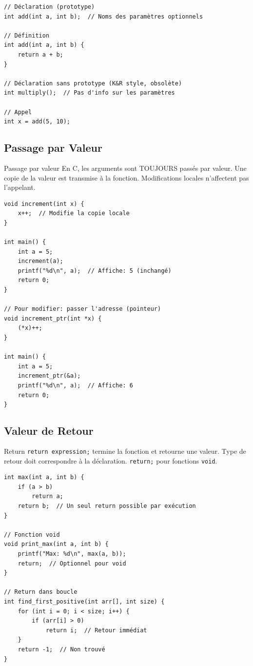 \documentclass[10pt,a4paper]{article}
\begin{document}
\begin{lstlisting}[caption={Déclaration et définition}]
// Déclaration (prototype)
int add(int a, int b);  // Noms des paramètres optionnels

// Définition
int add(int a, int b) {
    return a + b;
}

// Déclaration sans prototype (K&R style, obsolète)
int multiply();  // Pas d'info sur les paramètres

// Appel
int x = add(5, 10);
\end{lstlisting}

\subsection{Passage par Valeur}

\begin{techbox}{Passage par valeur}
En C, les arguments sont TOUJOURS passés par valeur. Une copie de la valeur est transmise à la fonction. Modifications locales n'affectent pas l'appelant.
\end{techbox}

\begin{lstlisting}[caption={Passage par valeur}]
void increment(int x) {
    x++;  // Modifie la copie locale
}

int main() {
    int a = 5;
    increment(a);
    printf("%d\n", a);  // Affiche: 5 (inchangé)
    return 0;
}

// Pour modifier: passer l'adresse (pointeur)
void increment_ptr(int *x) {
    (*x)++;
}

int main() {
    int a = 5;
    increment_ptr(&a);
    printf("%d\n", a);  // Affiche: 6
    return 0;
}
\end{lstlisting}

\subsection{Valeur de Retour}

\begin{techbox}{Return}
\texttt{return expression;} termine la fonction et retourne une valeur. Type de retour doit correspondre à la déclaration. \texttt{return;} pour fonctions \texttt{void}.
\end{techbox}

\begin{lstlisting}[caption={Valeurs de retour}]
int max(int a, int b) {
    if (a > b)
        return a;
    return b;  // Un seul return possible par exécution
}

// Fonction void
void print_max(int a, int b) {
    printf("Max: %d\n", max(a, b));
    return;  // Optionnel pour void
}

// Return dans boucle
int find_first_positive(int arr[], int size) {
    for (int i = 0; i < size; i++) {
        if (arr[i] > 0)
            return i;  // Retour immédiat
    }
    return -1;  // Non trouvé
}
\end{lstlisting}
\end{document}
